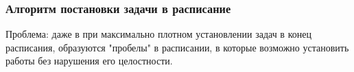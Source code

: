 \begin{frame}
    \frametitle{Алгоритм постановки задачи в расписание}
    {
        \tiny
    }
    Проблема: даже в при максимально плотном установлении задач в конец расписания, образуются "пробелы" в расписании, в которые возможно установить работы без нарушения его целостности.
\end{frame}


